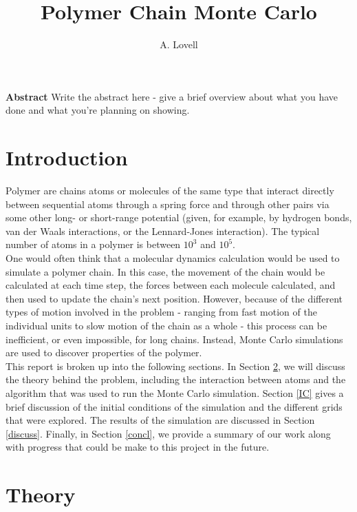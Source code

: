 \documentclass{article}
\begin{document}
\title{Polymer Chain Monte Carlo}
\author{A. Lovell}
\maketitle

\noindent \textbf{Abstract}  Write the abstract here - give a brief overview about what you have done and what you're planning on showing.

\begin{multicols}{2}

\section{Introduction}

Polymer are chains atoms or molecules of the same type that interact directly between sequential atoms through a spring force and through other pairs via some other long- or short-range potential (given, for example, by hydrogen bonds, van der Waals interactions, or the Lennard-Jones interaction).  The typical number of atoms in a polymer is between $10^3$ and $10^5$.  \\

One would often think that a molecular dynamics calculation would be used to simulate a polymer chain.  In this case, the movement of the chain would be calculated at each time step, the forces between each molecule calculated, and then used to update the chain's next position.  However, because of the different types of motion involved in the problem - ranging from fast motion of the individual units to slow motion of the chain as a whole - this process can be inefficient, or even impossible, for long chains.  \cite{PhilNotes} Instead, Monte Carlo simulations are used to discover properties of the polymer.  \\

This report is broken up into the following sections.  In Section \ref{theory}, we will discuss the theory behind the problem, including the interaction between atoms and the algorithm that was used to run the Monte Carlo simulation.  Section \ref{IC} gives a brief discussion of the initial conditions of the simulation and the different grids that were explored.  The results of the simulation are discussed in Section \ref{discuss}.  Finally, in Section \ref{concl}, we provide a summary of our work along with progress that could be make to this project in the future. \\

\section{Theory}
\label{theory}


\end{multicols}
\end{document}

